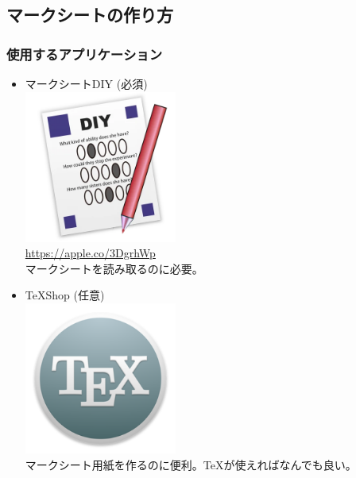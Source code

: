 \documentclass[dvipdfmx,jb5]{jarticle}
\begin{document}
\subsection{マークシートの作り方}
\subsubsection{使用するアプリケーション}
\begin{itemize}
 \item マークシートDIY {\color{red}(必須)}\\
 \includegraphics[width=5cm]{assets/answersheet-diy.png}\\
 \url{https://apple.co/3DgrhWp}\\
 マークシートを読み取るのに必要。
 \item \TeX Shop (任意)\\
 \includegraphics[width=5cm]{assets/TeX.png}\\
 マークシート用紙を作るのに便利。\TeX が使えればなんでも良い。
\end{itemize}
\end{document}
